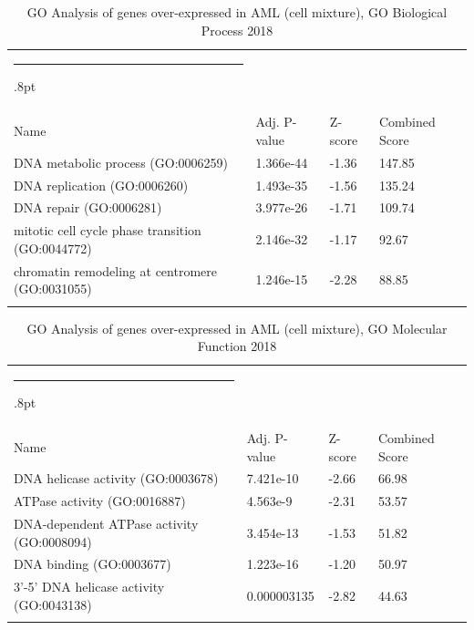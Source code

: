 \documentclass[3p,authoryear,preprint,12pt]{elsarticle}
\makeatletter
\def\hlinewd#1{%
  \noalign{\ifnum0=`}\fi\hrule \@height #1%
  \futurelet\reserved@a\@xhline}
\def\tbltoprule{\hlinewd{.8pt}\\[-12pt]}
\def\tblbottomrule{\noalign{\vspace*{6pt}}\hline\noalign{\vspace*{2pt}}}
\def\tblmidrule{\noalign{\vspace*{6pt}}\hline\noalign{\vspace*{2pt}}}
\makeatother
\begin{document}
\begin{table}[!htbp]
	\caption{{GO Analysis of genes over-expressed in AML (cell mixture), GO Biological Process 2018} }
	\label{tw-de478ae31hc6}
	\def\arraystretch{1}
	\ignorespaces 
	\centering 
	\begin{tabulary}{\linewidth}{p{\dimexpr.65\tabcolsep}p{\dimexpr.15\tabcolsep}p{\dimexpr.1\tabcolsep}p{\dimexpr.1\tabcolsep}}
		\tbltoprule Name & Adj. P-value & Z-score & Combined Score\\
		\tblmidrule
DNA metabolic process (GO:0006259) & 1.366e-44 & -1.36 & 147.85 \\
DNA replication (GO:0006260) & 1.493e-35 & -1.56 & 135.24 \\
DNA repair (GO:0006281) & 3.977e-26 & -1.71 & 109.74 \\
mitotic cell cycle phase transition (GO:0044772) & 2.146e-32 & -1.17 & 92.67 \\
chromatin remodeling at centromere (GO:0031055) & 1.246e-15 & -2.28 & 88.85 \\
		\tblbottomrule
	\end{tabulary}\par 
\end{table}
\begin{table}[!htbp]
	\caption{{GO Analysis of genes over-expressed in AML (cell mixture), GO Molecular Function 2018} }
	\label{tw-de478ae31ic6}
	\def\arraystretch{1}
	\ignorespaces 
	\centering 
	\begin{tabulary}{\linewidth}{p{\dimexpr.65\tabcolsep}p{\dimexpr.15\tabcolsep}p{\dimexpr.1\tabcolsep}p{\dimexpr.1\tabcolsep}}
		\tbltoprule Name & Adj. P-value & Z-score & Combined Score\\
		\tblmidrule
DNA helicase activity (GO:0003678) & 7.421e-10 & -2.66 & 66.98 \\
ATPase activity (GO:0016887) & 4.563e-9 & -2.31 & 53.57 \\
DNA-dependent ATPase activity (GO:0008094) & 3.454e-13 & -1.53 & 51.82 \\
DNA binding (GO:0003677) & 1.223e-16 & -1.20 & 50.97 \\
3'-5' DNA helicase activity (GO:0043138) & 0.000003135 & -2.82 & 44.63 \\
		\tblbottomrule
	\end{tabulary}\par 
\end{table}
\end{document}
